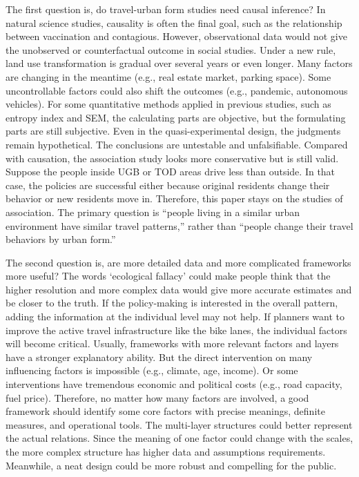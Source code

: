 \documentclass[
  12pt,
]{article}
\begin{document}
The first question is, do travel-urban form studies need causal inference? In natural science studies, causality is often the final goal, such as the relationship between vaccination and contagious. However, observational data would not give the unobserved or counterfactual outcome in social studies. Under a new rule, land use transformation is gradual over several years or even longer. Many factors are changing in the meantime (e.g., real estate market, parking space). Some uncontrollable factors could also shift the outcomes (e.g., pandemic, autonomous vehicles). For some quantitative methods applied in previous studies, such as entropy index and SEM, the calculating parts are objective, but the formulating parts are still subjective. Even in the quasi-experimental design, the judgments remain hypothetical. The conclusions are untestable and unfalsifiable. Compared with causation, the association study looks more conservative but is still valid. Suppose the people inside UGB or TOD areas drive less than outside. In that case, the policies are successful either because original residents change their behavior or new residents move in. Therefore, this paper stays on the studies of association. The primary question is ``people living in a similar urban environment have similar travel patterns,'' rather than ``people change their travel behaviors by urban form.''

The second question is, are more detailed data and more complicated frameworks more useful? The words `ecological fallacy' could make people think that the higher resolution and more complex data would give more accurate estimates and be closer to the truth. If the policy-making is interested in the overall pattern, adding the information at the individual level may not help. If planners want to improve the active travel infrastructure like the bike lanes, the individual factors will become critical. Usually, frameworks with more relevant factors and layers have a stronger explanatory ability. But the direct intervention on many influencing factors is impossible (e.g., climate, age, income). Or some interventions have tremendous economic and political costs (e.g., road capacity, fuel price). Therefore, no matter how many factors are involved, a good framework should identify some core factors with precise meanings, definite measures, and operational tools. The multi-layer structures could better represent the actual relations. Since the meaning of one factor could change with the scales, the more complex structure has higher data and assumptions requirements. Meanwhile, a neat design could be more robust and compelling for the public.
\end{document}
